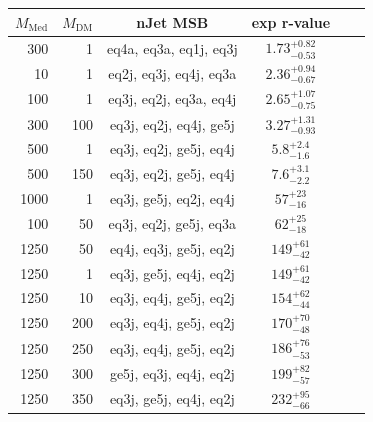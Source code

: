 \begin{table}
  \centering
  \begin{tabular}{rrcccc}
    \hline\hline
    $M_{\text{Med}}$ & $M_{\text{DM}}$ & nJet MSB & exp r-value\\
    \hline
      300 &   1 & eq4a, eq3a, eq1j, eq3j & $1.73_{-0.53}^{+0.82}$     \\ %
       10 &   1 & eq2j, eq3j, eq4j, eq3a & $2.36_{-0.67}^{+0.94}$     \\ %
      100 &   1 & eq3j, eq2j, eq3a, eq4j & $2.65_{-0.75}^{+1.07}$     \\ %
      300 & 100 & eq3j, eq2j, eq4j, ge5j & $3.27_{-0.93}^{+1.31}$     \\ %
      500 &   1 & eq3j, eq2j, ge5j, eq4j & $5.8_{-1.6}^{+2.4}$        \\ %
      500 & 150 & eq3j, eq2j, ge5j, eq4j & $7.6_{-2.2}^{+3.1}$        \\ %
     1000 &   1 & eq3j, ge5j, eq2j, eq4j & $57_{-16}^{+23}$           \\ %
      100 &  50 & eq3j, eq2j, ge5j, eq3a & $62_{-18}^{+25}$           \\ %
     1250 &  50 & eq4j, eq3j, ge5j, eq2j & $149_{-42}^{+61}$          \\ %
     1250 &   1 & eq3j, ge5j, eq4j, eq2j & $149_{-42}^{+61}$          \\ %
     1250 &  10 & eq3j, eq4j, ge5j, eq2j & $154_{-44}^{+62}$          \\ %
     1250 & 200 & eq3j, eq4j, ge5j, eq2j & $170_{-48}^{+70}$          \\ %
     1250 & 250 & eq3j, eq4j, ge5j, eq2j & $186_{-53}^{+76}$          \\ %
     1250 & 300 & ge5j, eq3j, eq4j, eq2j & $199_{-57}^{+82}$          \\ %
     1250 & 350 & eq3j, ge5j, eq4j, eq2j & $232_{-66}^{+95}$          \\ %

\end{tabular}
\end{table}
